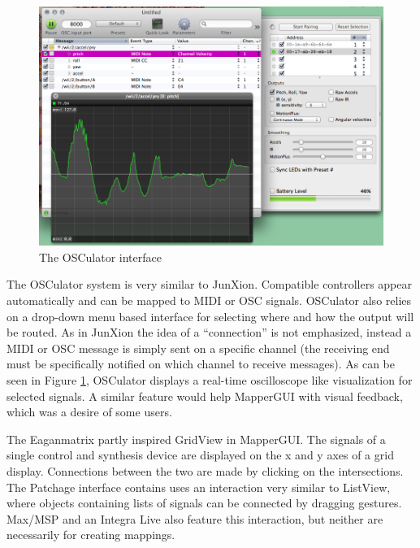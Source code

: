 \begin{figure}
	\centering
		\includegraphics[width=\textwidth]{figures/osculator}
		\caption{The OSCulator interface}
		\label{fig:osculator}
\end{figure}

The OSCulator system \cite{osculator} is very similar to JunXion. Compatible controllers appear automatically and can be mapped to MIDI or OSC signals. OSCulator also relies on a drop-down menu based interface for selecting where and how the output will be routed. As in JunXion the idea of a ``connection'' is not emphasized, instead a MIDI or OSC message is simply sent on a specific channel (the receiving end must be specifically notified on which channel to receive messages). As can be seen in Figure \ref{fig:osculator}, OSCulator displays a real-time oscilloscope like visualization for selected signals. A similar feature would help MapperGUI with visual feedback, which was a desire of some users.

The Eaganmatrix \cite{eaganmatrix} partly inspired GridView in MapperGUI. The signals of a single control and synthesis device are displayed on the x and y axes of a grid display. Connections between the two are made by clicking on the intersections. The Patchage interface \cite{patchage} contains uses an interaction very similar to ListView, where objects containing lists of signals can be connected by dragging gestures. Max/MSP and an Integra Live \cite{integra} also feature this interaction, but neither are necessarily for creating mappings. 






